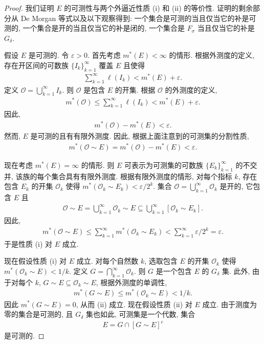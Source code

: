 \documentclass[../../main.tex]{subfiles}
\begin{document}
\begin{proof}
我们证明 $E$ 的可测性与两个外逼近性质 (i) 和 (ii) 的等价性. 证明的剩余部分从 De Morgan 等式以及以下观察得到: 一个集合是可测的当且仅当它的补是可测的, 一个集合是开的当且仅当它的补是闭的, 一个集合是 $F_{\sigma}$ 当且仅当它的补是 $G_{\delta}$.

假设 $E$ 是可测的. 令 $\varepsilon>0$. 首先考虑 $m^{*}(E)<\infty$ 的情形. 根据外测度的定义, 存在开区间的可数族 $\{I_{k}\}_{k=1}^{\infty}$ 覆盖 $E$ 且使得
\begin{align*}
\sum_{k=1}^{\infty}\ell(I_{k})<m^{*}(E)+\varepsilon.
\end{align*}
定义 $\mathcal{O}=\bigcup_{k=1}^{\infty}I_{k}$. 则 $\mathcal{O}$ 是包含 $E$ 的开集. 根据 $\mathcal{O}$ 的外测度的定义,
\begin{align*}
m^{*}(\mathcal{O})\leqslant\sum_{k=1}^{\infty}\ell(I_{k})<m^{*}(E)+\varepsilon.
\end{align*}
因此,
\begin{align*}
m^{*}(\mathcal{O})-m^{*}(E)<\varepsilon.
\end{align*}
然而, $E$ 是可测的且有有限外测度. 因此, 根据上面注意到的可测集的分割性质,
\begin{align*}
m^{*}(\mathcal{O}\sim E)=m^{*}(\mathcal{O})-m^{*}(E)<\varepsilon.
\end{align*}

现在考虑 $m^{*}(E)=\infty$ 的情形. 则 $E$ 可表示为可测集的可数族 $\{E_{k}\}_{k=1}^{\infty}$ 的不交并, 该族的每个集合具有有限外测度. 根据有限外测度的情形, 对每个指标 $k$, 存在包含 $E_{k}$ 的开集 $\mathcal{O}_{k}$ 使得 $m^{*}(\mathcal{O}_{k}\sim E_{k})<\varepsilon/2^{k}$. 集合 $\mathcal{O}=\bigcup_{k=1}^{\infty}\mathcal{O}_{k}$ 是开的, 它包含 $E$ 且
\begin{align*}
\mathcal{O}\sim E=\bigcup_{k=1}^{\infty}\mathcal{O}_{k}\sim E\subseteq\bigcup_{k=1}^{\infty}[\mathcal{O}_{k}\sim E_{k}].
\end{align*}
因此,
\begin{align*}
m^{*}(\mathcal{O}\sim E)\leqslant\sum_{k=1}^{\infty}m^{*}(\mathcal{O}_{k}\sim E_{k})<\sum_{k=1}^{\infty}\varepsilon/2^{k}=\varepsilon.
\end{align*}
于是性质 (i) 对 $E$ 成立.

现在假设性质 (i) 对 $E$ 成立. 对每个自然数 $k$, 选取包含 $E$ 的开集 $\mathcal{O}_{k}$ 使得 $m^{*}(\mathcal{O}_{k}\sim E)<1/k$. 定义 $G=\bigcap_{k=1}^{\infty}\mathcal{O}_{k}$. 则 $G$ 是一个包含 $E$ 的 $G_{\delta}$ 集. 此外, 由于对每个 $k$, $G\sim E\subseteq\mathcal{O}_{k}\sim E$, 根据外测度的单调性,
\begin{align*}
m^{*}(G\sim E)\leqslant m^{*}(\mathcal{O}_{k}\sim E)<1/k.
\end{align*}
因此 $m^{*}(G\sim E)=0$, 从而 (ii) 成立. 现在假设性质 (ii) 对 $E$ 成立. 由于测度为零的集合是可测的, 且 $G_{\delta}$ 集也如此, 可测集是一个代数, 集合
\begin{align*}
E=G\cap[G\sim E]^{c}
\end{align*}
是可测的.
\end{proof}
\end{document}
